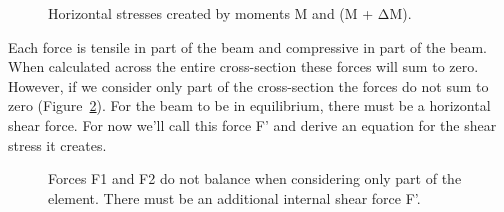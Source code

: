 \documentclass[
  letterpaper,
  DIV=11,
  numbers=noendperiod]{scrreprt}
\theoremstyle{definition}
\theoremstyle{remark}
\begin{document}
\begin{figure}


\caption{\label{fig-10.9}Horizontal stresses created by moments M and (M
+ ΔM).}

\end{figure}%

Each force is tensile in part of the beam and compressive in part of the
beam. When calculated across the entire cross-section these forces will
sum to zero. However, if we consider only part of the cross-section the
forces do not sum to zero (Figure~\ref{fig-10.10}). For the beam to be
in equilibrium, there must be a horizontal shear force. For now we'll
call this force F' and derive an equation for the shear stress it
creates.

\begin{figure}


\caption{\label{fig-10.10}Forces F1 and F2 do not balance when
considering only part of the element. There must be an additional
internal shear force F'.}

\end{figure}%
\end{document}
